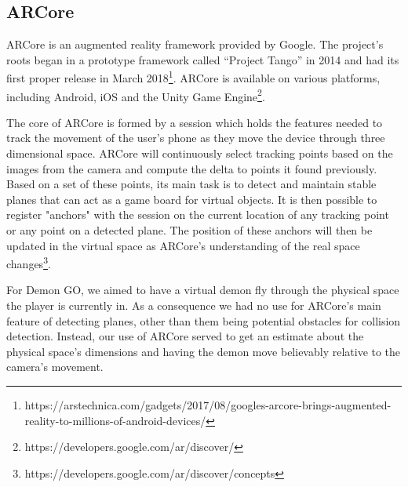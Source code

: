 \subsection{ARCore}
ARCore is an augmented reality framework provided by Google.
The project's roots began in a prototype framework called \enquote{Project Tango} in 2014 and had its first proper release in March 2018\footnote{https://arstechnica.com/gadgets/2017/08/googles-arcore-brings-augmented-reality-to-millions-of-android-devices/}.
ARCore is available on various platforms, including Android, iOS and the Unity Game Engine\footnote{https://developers.google.com/ar/discover/}.

The core of ARCore is formed by a session which holds the features needed to track the movement of the user's phone as they move the device through three dimensional space.
ARCore will continuously select tracking points based on the images from  the camera and compute the delta to points it found previously.
Based on a set of these points, its main task is to detect and maintain stable planes that can act as a game board for virtual objects.
It is then possible to register "anchors" with the session on the current location of any tracking point or any point on a detected plane.
The position of these anchors will then be updated in the virtual space as ARCore's understanding of the real space changes\footnote{https://developers.google.com/ar/discover/concepts}.

For Demon GO, we aimed to have a virtual demon fly through the physical space the player is currently in.
As a consequence we had no use for ARCore's main feature of detecting planes, other than them being potential obstacles for collision detection.
Instead, our use of ARCore served to get an estimate about the physical space's dimensions and having the demon move believably relative to the camera's movement.

